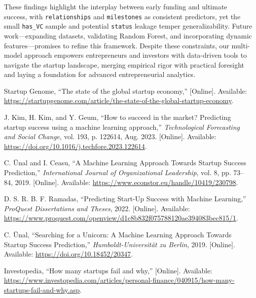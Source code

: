 \documentclass[conference]{IEEEtran}
\begin{document}
    These findings highlight the interplay between early funding and ultimate success, with \texttt{relationships} and \texttt{milestones} as consistent predictors, yet the small \texttt{has\_VC} sample and potential \texttt{status} leakage temper generalizability. Future work—expanding datasets, validating Random Forest, and incorporating dynamic features—promises to refine this framework. Despite these constraints, our multi-model approach empowers entrepreneurs and investors with data-driven tools to navigate the startup landscape, merging empirical rigor with practical foresight and laying a foundation for advanced entrepreneurial analytics.


\newpage

\begin{thebibliography}{6}

    Startup Genome, “The state of the global startup economy,” [Online]. Available: \url{https://startupgenome.com/article/the-state-of-the-global-startup-economy}.

    J. Kim, H. Kim, and Y. Geum, “How to succeed in the market? Predicting startup success using a machine learning approach,” \textit{Technological Forecasting and Social Change}, vol. 193, p. 122614, Aug. 2023. [Online]. Available: \url{https://doi.org/10.1016/j.techfore.2023.122614}.

    C. Ünal and I. Ceasu, “A Machine Learning Approach Towards Startup Success Prediction,” \textit{International Journal of Organizational Leadership}, vol. 8, pp. 73–84, 2019. [Online]. Available: \url{https://www.econstor.eu/handle/10419/230798}.

    D. S. R. B. F. Ramadas, “Predicting Start-Up Success with Machine Learning,” \textit{ProQuest Dissertations and Theses}, 2022. [Online]. Available: \url{https://www.proquest.com/openview/d1c8b832f075788120ae394083bec815/1}.

    C. Ünal, “Searching for a Unicorn: A Machine Learning Approach Towards Startup Success Prediction,” \textit{Humboldt-Universität zu Berlin}, 2019. [Online]. Available: \url{https://doi.org/10.18452/20347}.

    Investopedia, “How many startups fail and why,” [Online]. Available: \url{https://www.investopedia.com/articles/personal-finance/040915/how-many-startups-fail-and-why.asp}.

\end{thebibliography}
\end{document}
